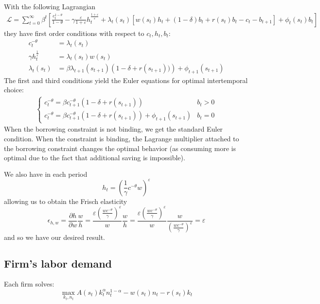 \documentclass[11pt]{amsart}
\begin{document}
With the following Lagrangian
\begin{align*}
\mathcal{L} = \sum_{t=0}^{\infty} \beta^t \left[  \frac{c_t^{1-\theta}}{1-\theta}  - \gamma \frac{\varepsilon}{1+\varepsilon} h_t^{\frac{1+\varepsilon}{\varepsilon}} + \lambda_t(s_t) \left[ w(s_t) h_t + (1-\delta) b_{t} + r(s_t) b_{t} - c_t - b_{t+1}  \right] + \phi_t(s_t) b_t \right]
\end{align*}
they have first order conditions with respect to $c_t, h_t, b_t$: 
\begin{align*}
c_t^{-\theta} &= \lambda_t(s_t) \\
\gamma h_t^{\frac{1}{\varepsilon}} &= \lambda_t(s_t) w(s_t) \\
\lambda_t(s_t) &= \beta \lambda_{t+1}(s_{t+1}) \left( 1- \delta + r(s_{t+1}))  \right) + \phi_{t+1}(s_{t+1})
\end{align*}
The first and third conditions yield the Euler equations for optimal intertemporal choice:
\begin{align*}
\begin{cases}
c_t^{-\theta} = \beta c_{t+1}^{-\theta} \left( 1- \delta + r(s_{t+1})  \right) & b_t > 0 \\    
c_t^{-\theta} = \beta c_{t+1}^{-\theta} \left( 1- \delta + r(s_{t+1})  \right)  +  \phi_{t+1}(s_{t+1}) &  b_t = 0    
\end{cases}
\end{align*}
When the borrowing constraint is not binding, we get the standard Euler condition. When the constraint is binding, the Lagrange multiplier attached to the borrowing constraint changes the optimal behavior (as consuming more is optimal due to the fact that additional saving is impossible). 

We also have in each period
\[
h_t = \left( \frac{1}{\gamma} c^{-\theta} w \right)^\varepsilon
\] 
allowing us to obtain the Frisch elasticity
\[
\epsilon_{h,w} = \frac{\partial h}{\partial w} \frac{w}{h} = \frac{\varepsilon  \left(\frac{w c^{-\theta }}{\gamma }\right)^{\varepsilon }}{w} \frac{w}{h} = \frac{\varepsilon  \left(\frac{w c^{-\theta }}{\gamma }\right)^{\varepsilon }}{w} \frac{w}{\left(\frac{w c^{-\theta }}{\gamma }\right)^{\varepsilon }} = \varepsilon
\]
and so we have our desired result.

\subsection{Firm's labor demand}
Each firm solves: 
\begin{equation*}
\max_{k_t, n_t} A(s_t) k_t^\alpha n_t^{1-\alpha} - w(s_t) n_t - r(s_t) k_t
\end{equation*}
\end{document}
